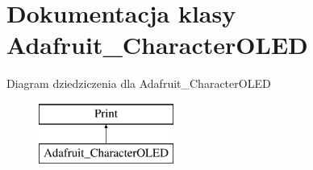 \hypertarget{class_adafruit___character_o_l_e_d}{}\section{Dokumentacja klasy Adafruit\+\_\+\+Character\+O\+L\+ED}
\label{class_adafruit___character_o_l_e_d}
Diagram dziedziczenia dla Adafruit\+\_\+\+Character\+O\+L\+ED\begin{figure}[H]
\begin{center}
\leavevmode
\includegraphics[height=2.000000cm]{class_adafruit___character_o_l_e_d}
\end{center}
\end{figure}
